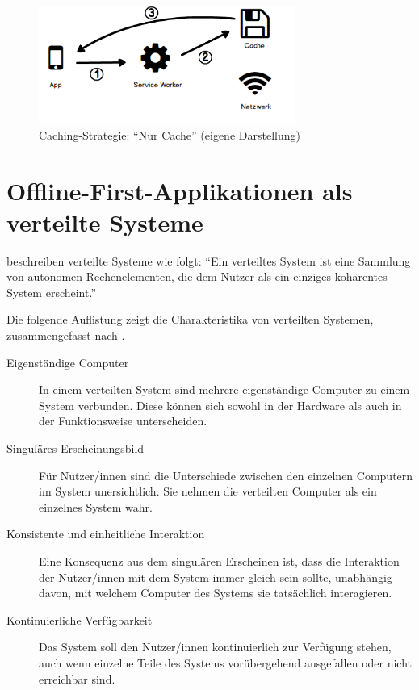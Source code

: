 \documentclass[a4paper, 12pt]{scrreprt}
\begin{document}
\begin{figure}[H]
	\centering
	\includegraphics[width=0.75\textwidth]{cacheonly.png}
	\caption[Caching-Strategie: \enquote{Nur Cache}]{Caching-Strategie: \enquote{Nur Cache} (eigene Darstellung)}
	\label{fig:cachingCacheOnly}
\end{figure}

\section{Offline-First-Applikationen als verteilte Systeme}\label{sec:OfflineFirstVerteiteSysteme}
\citet{ArticleDistributedSystems} beschreiben verteilte Systeme wie folgt: \enquote{Ein verteiltes System ist eine Sammlung von autonomen Rechenelementen, die dem Nutzer als ein einziges kohärentes System erscheint.}

Die folgende Auflistung zeigt die Charakteristika von verteilten Systemen, zusammengefasst nach \citet[S. 2-3]{BookDistributedSystemsDefinition}.

\begin{description}
\item[Eigenständige Computer] In einem verteilten System sind mehrere eigenständige Computer zu einem System verbunden. Diese können sich sowohl in der Hardware als auch in der Funktionsweise unterscheiden. 
\item[Singuläres Erscheinungsbild] Für Nutzer/innen sind die Unterschiede zwischen den einzelnen Computern im System unersichtlich. Sie nehmen die verteilten Computer als ein einzelnes System wahr. 
\item[Konsistente und einheitliche Interaktion]
	Eine Konsequenz aus dem singulären Erscheinen ist, dass die Interaktion der Nutzer/innen mit dem System immer gleich sein sollte, unabhängig davon, mit welchem Computer des Systems sie tatsächlich interagieren. 
\item[Kontinuierliche Verfügbarkeit]
	Das System soll den Nutzer/innen kontinuierlich zur Verfügung stehen, auch wenn einzelne Teile des Systems vorübergehend ausgefallen oder nicht erreichbar sind.
\end{description}
\label{tab:charakteristikaDistributedSystem}
\end{document}
